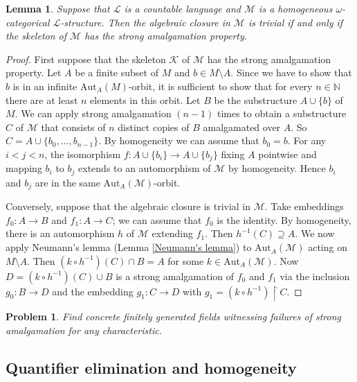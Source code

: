 \documentclass[10pt]{amsart}
\renewcommand{\L}{\mathcal{L}}
\newcommand{\ran}[1]{{{\rm{ran}}(#1)}}
\newcommand{\NNN}{\mathbb{N}}
\newcommand{\MM}{\mathcal{M}}
\newcommand{\KK}{\mathcal{K}}
\newcommand{\Aut}{\mathrm{Aut}}
\newtheorem{lemma}[theorem]{Lemma}
\newtheorem{problem}[theorem]{Problem}
\theoremstyle{definition}
\theoremstyle{remark}
\begin{document}
\begin{lemma} 
Suppose that $\L$ is a countable language and $\MM$ is a homogeneous $\omega$-categorical $\L$-structure. Then the algebraic closure in $\MM$ is trivial if and only if the skeleton of $\MM$ has the strong amalgamation property. 
\end{lemma} 
\begin{proof} 
First suppose that the skeleton $\KK$ of $\MM$ has the strong amalgamation property. Let $A$ be a finite subset of $M$ and $b\in M\setminus A$. Since we have to show that $b$ is in an infinite $\Aut_A(M)$-orbit, it is sufficient to show that for every $n\in\NNN$ there are at least $n$ elements in this orbit. Let $B$ be the substructure $A\cup\{b\}$ of $M$. We can apply strong amalgamation $(n-1)$ times to obtain a substructure $C$ of $\MM$ that consists of $n$ distinct copies of $B$ amalgamated over $A$. So $C=A\cup\{b_0,\dots,b_{n-1}\}$. By homogeneity we can assume that $b_0=b$. For any $i<j<n$, the isomorphism $f\colon A\cup\{b_i\}\rightarrow A\cup\{b_j\}$ fixing $A$ pointwise and mapping $b_i$ to $b_j$ extends to an automorphism of $\MM$ by homogeneity. Hence $b_i$ and $b_j$ are in the same $\Aut_A(\MM)$-orbit. 

Conversely, suppose that the algebraic closure is trivial in $\MM$. Take embeddings $f_0\colon A\rightarrow B$ and $f_1\colon A\rightarrow C$; we can assume that $f_0$ is the identity. 
By homogeneity, there is an automorphism $h$ of $\MM$ extending $f_1$. Then $h^{-1}(C)\supseteq A$. We now apply Neumann's lemma (Lemma \ref{Neumann's lemma}) to $\Aut_A(\MM)$ acting on $M\setminus A$. Then $(k\circ h^{-1})(C)\cap B=A$ for some $k\in \Aut_A(\MM)$. Now $D=(k\circ h^{-1})(C)\cup B$ is a strong amalgamation of $f_0$ and $f_1$ via the inclusion $g_0\colon B\rightarrow D$ and the embedding $g_1\colon C\rightarrow D$ with $g_1=(k\circ h^{-1}){\upharpoonright}C$. 
\end{proof} 

\begin{problem} 
Find concrete finitely generated fields witnessing failures of strong amalgamation for any characteristic. 
\end{problem} 





\subsection{Quantifier elimination and homogeneity} 
\end{document}
